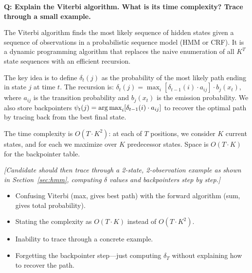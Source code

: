 \begin{interviewq}
\textbf{Q: Explain the Viterbi algorithm.  What is its time complexity?
Trace through a small example.}

 \quad {} \quad \badgefreq{\freqmed}

\stronganswer
The Viterbi algorithm finds the most likely sequence of hidden states given a
sequence of observations in a probabilistic sequence model (HMM or CRF).  It
is a dynamic programming algorithm that replaces the naive enumeration of all
$K^T$ state sequences with an efficient recursion.

The key idea is to define $\delta_t(j)$ as the probability of the most likely
path ending in state $j$ at time $t$.  The recursion is:
$\delta_t(j) = \max_i [\delta_{t-1}(i) \cdot a_{ij}] \cdot b_j(x_t)$, where
$a_{ij}$ is the transition probability and $b_j(x_t)$ is the emission probability.
We also store backpointers $\psi_t(j) = \operatorname*{arg\,max}_i [\delta_{t-1}(i) \cdot a_{ij}]$
to recover the optimal path by tracing back from the best final state.

The time complexity is $O(T \cdot K^2)$: at each of $T$ positions, we consider
$K$ current states, and for each we maximize over $K$ predecessor states.
Space is $O(T \cdot K)$ for the backpointer table.

\emph{[Candidate should then trace through a 2-state, 2-observation example
as shown in Section~\ref{sec:hmm}, computing $\delta$ values and backpointers
step by step.]}

\redflags
\begin{itemize}
    \item Confusing Viterbi (max, gives best path) with the forward algorithm
          (sum, gives total probability).
    \item Stating the complexity as $O(T \cdot K)$ instead of $O(T \cdot K^2)$.
    \item Inability to trace through a concrete example.
    \item Forgetting the backpointer step---just computing $\delta_T$ without
          explaining how to recover the path.
\end{itemize}



\end{interviewq}
